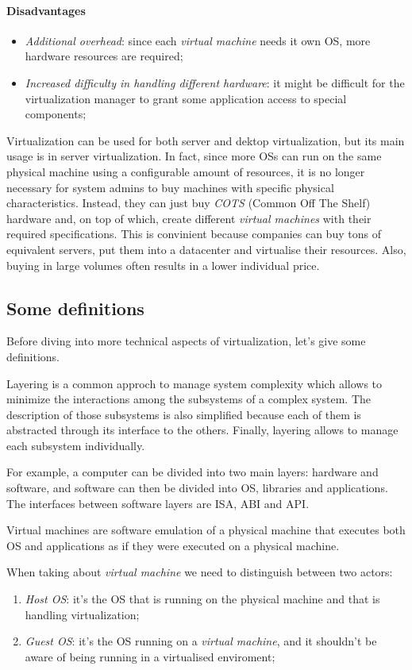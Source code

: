 \paragraph{Disadvantages}
\begin{itemize}
    \item\emph{Additional overhead}: since each \emph{virtual machine} needs it
    own OS, more hardware resources are required;
    \item\emph{Increased difficulty in handling different hardware}: it might
    be difficult for the virtualization manager to grant some application access
    to special components;
\end{itemize}
Virtualization can be used for both server and dektop virtualization, but its
main usage is in server virtualization. In fact, since more OSs can
run on the same physical machine using a configurable amount of resources, it is
no longer necessary for system admins to buy machines with specific physical
characteristics. Instead, they can just buy \emph{COTS} (Common Off The Shelf)
hardware and, on top of which, create different \emph{virtual machines} with their
required specifications. This is convinient because companies can buy tons of
equivalent servers, put them into a datacenter and virtualise their resources.
Also, buying in large volumes often results in a lower individual price.

\subsection{Some definitions}
Before diving into more technical aspects of virtualization, let's give some
definitions.

\begin{definition}[Layering]
    Layering is a common approch to manage system complexity which allows
    to minimize the interactions among the subsystems of a complex system. The
    description of those subsystems is also simplified because each of them is
    abstracted through its interface to the others. Finally, layering allows
    to manage each subsystem individually.
\end{definition}\noindent
For example, a computer can be divided into two main layers: hardware and software,
and software can then be divided into OS, libraries and applications.
The interfaces between software layers are ISA, ABI and API.

\begin{definition} Virtual machines are software emulation
    of a physical machine that executes both OS and applications as if they were
    executed on a physical machine.
\end{definition}\noindent
When taking about \emph{virtual machine} we need to distinguish between two actors:
\begin{enumerate}
    \item\emph{Host OS}: it's the OS that is running on the physical machine and
    that is handling virtualization;
    \item\emph{Guest OS}: it's the OS running on a \emph{virtual machine}, and it
    shouldn't be aware of being running in a virtualised enviroment;
\end{enumerate}

